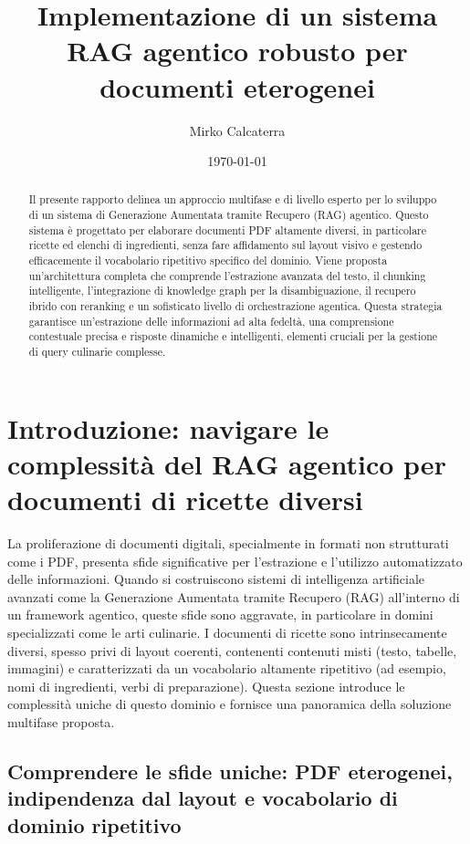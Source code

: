 \documentclass[a4paper, 11pt]{article}
\title{Implementazione di un sistema RAG agentico robusto per documenti eterogenei}
\author{Mirko Calcaterra}
\date{\today}
\begin{document}
\maketitle
\thispagestyle{empty}
\clearpage

\begin{abstract}
\noindent Il presente rapporto delinea un approccio multifase e di livello esperto per lo sviluppo di un sistema di Generazione Aumentata tramite Recupero (RAG) agentico. Questo sistema è progettato per elaborare documenti PDF altamente diversi, in particolare ricette ed elenchi di ingredienti, senza fare affidamento sul layout visivo e gestendo efficacemente il vocabolario ripetitivo specifico del dominio. Viene proposta un'architettura completa che comprende l'estrazione avanzata del testo, il chunking intelligente, l'integrazione di knowledge graph per la disambiguazione, il recupero ibrido con reranking e un sofisticato livello di orchestrazione agentica. Questa strategia garantisce un'estrazione delle informazioni ad alta fedeltà, una comprensione contestuale precisa e risposte dinamiche e intelligenti, elementi cruciali per la gestione di query culinarie complesse.
\end{abstract}

\tableofcontents
\clearpage

\section{Introduzione: navigare le complessità del RAG agentico per documenti di ricette diversi}

La proliferazione di documenti digitali, specialmente in formati non strutturati come i PDF, presenta sfide significative per l'estrazione e l'utilizzo automatizzato delle informazioni. Quando si costruiscono sistemi di intelligenza artificiale avanzati come la Generazione Aumentata tramite Recupero (RAG) all'interno di un framework agentico, queste sfide sono aggravate, in particolare in domini specializzati come le arti culinarie. I documenti di ricette sono intrinsecamente diversi, spesso privi di layout coerenti, contenenti contenuti misti (testo, tabelle, immagini) e caratterizzati da un vocabolario altamente ripetitivo (ad esempio, nomi di ingredienti, verbi di preparazione). Questa sezione introduce le complessità uniche di questo dominio e fornisce una panoramica della soluzione multifase proposta.

\subsection{Comprendere le sfide uniche: PDF eterogenei, indipendenza dal layout e vocabolario di dominio ripetitivo}
\end{document}
